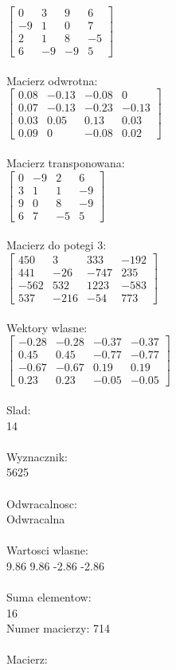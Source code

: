 \documentclass[a4paper,12pt]{article}
\begin{document}
$\begin{bmatrix} 0&3&9&6\\-9&1&0&7\\2&1&8&-5\\6&-9&-9&5 \end{bmatrix}$
\\
\\
Macierz odwrotna:\\

$\begin{bmatrix} 0.08&-0.13&-0.08&0\\0.07&-0.13&-0.23&-0.13\\0.03&0.05&0.13&0.03\\0.09&0&-0.08&0.02 \end{bmatrix}$
\\
\\
Macierz transponowana:\\

$\begin{bmatrix} 0&-9&2&6\\3&1&1&-9\\9&0&8&-9\\6&7&-5&5 \end{bmatrix}$
\\
\\
Macierz do potegi 3:\\

$\begin{bmatrix} 450&3&333&-192\\441&-26&-747&235\\-562&532&1223&-583\\537&-216&-54&773 \end{bmatrix}$
\\
\\
Wektory wlasne:\\

$\begin{bmatrix} -0.28&-0.28&-0.37&-0.37\\0.45&0.45&-0.77&-0.77\\-0.67&-0.67&0.19&0.19\\0.23&0.23&-0.05&-0.05 \end{bmatrix}$
\\
\\
Slad:\\
14
\\
\\
Wyznacznik:\\
5625
\\
\\
Odwracalnosc:\\
Odwracalna
\\
\\
Wartosci wlasne:\\
9.86 9.86 -2.86 -2.86
\\
\\
Suma elementow:\\
16
\\
\newpage
Numer macierzy:
714
\\
\\
Macierz:\\
\end{document}

